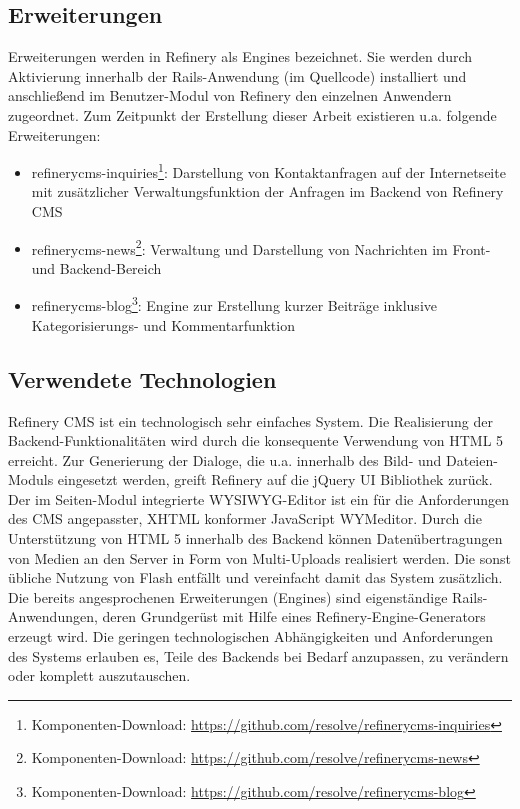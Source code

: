 \subsection{Erweiterungen}
Erweiterungen werden in Refinery als Engines bezeichnet. Sie werden durch Aktivierung innerhalb der Rails-Anwendung (im Quellcode) installiert und anschließend im Benutzer-Modul von Refinery den einzelnen Anwendern zugeordnet. Zum Zeitpunkt der Erstellung dieser Arbeit existieren u.a. folgende Erweiterungen:
\begin{itemize}
\item
refinerycms-inquiries\footnote{Komponenten-Download: \href{https://github.com/resolve/refinerycms-inquiries}{https://github.com/resolve/refinerycms-inquiries}}: Darstellung von Kontaktanfragen auf der Internetseite mit zusätzlicher Verwaltungsfunktion der Anfragen im Backend von Refinery CMS
\item
refinerycms-news\footnote{Komponenten-Download: \href{https://github.com/resolve/refinerycms-news}{https://github.com/resolve/refinerycms-news}}: Verwaltung und Darstellung von Nachrichten im Front- und Backend-Bereich
\item
 refinerycms-blog\footnote{Komponenten-Download: \href{https://github.com/resolve/refinerycms-blog}{https://github.com/resolve/refinerycms-blog}}: Engine zur Erstellung kurzer Beiträge inklusive Kategorisierungs- und Kommentarfunktion
\end{itemize}

\subsection{Verwendete Technologien}
Refinery CMS ist ein technologisch sehr einfaches System. Die Realisierung der Backend-Funktionalitäten wird durch die konsequente Verwendung von HTML 5 erreicht. Zur Generierung der Dialoge, die u.a. innerhalb des Bild- und Dateien-Moduls eingesetzt werden, greift Refinery auf die jQuery UI Bibliothek zurück. Der im Seiten-Modul integrierte WYSIWYG-Editor ist ein für die Anforderungen des CMS angepasster, XHTML konformer JavaScript WYMeditor.
Durch die Unterstützung von HTML 5 innerhalb des Backend können Datenübertragungen von Medien an den Server in Form von Multi-Uploads realisiert werden. Die sonst übliche Nutzung von Flash entfällt und vereinfacht damit das System zusätzlich.
Die bereits angesprochenen Erweiterungen (Engines) sind eigenständige Rails-Anwendungen, deren Grundgerüst mit Hilfe eines Refinery-Engine-Generators erzeugt wird.
Die geringen technologischen Abhängigkeiten und Anforderungen des Systems erlauben es, Teile des Backends bei Bedarf anzupassen, zu verändern oder komplett auszutauschen.



